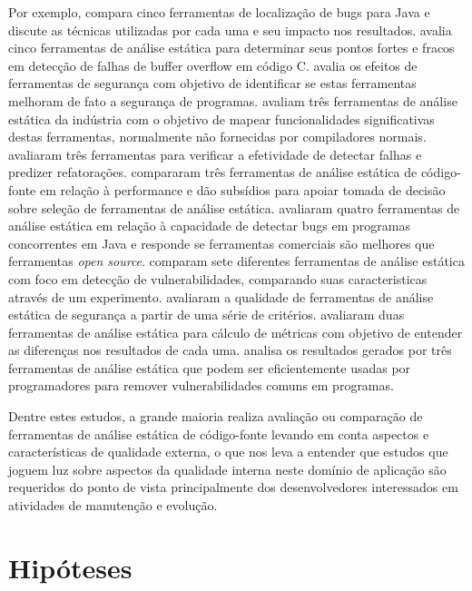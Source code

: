 Por exemplo,  compara cinco ferramentas de localização
de bugs para Java e discute as técnicas utilizadas por cada uma e seu impacto
nos resultados.  avalia cinco ferramentas de
análise estática para determinar seus pontos fortes e fracos em detecção de
falhas de buffer overflow em código C.  avalia os efeitos
de ferramentas de segurança com objetivo de identificar se estas ferramentas
melhoram de fato a segurança de programas. 
avaliam três ferramentas de análise estática da indústria com o objetivo de
mapear funcionalidades significativas destas ferramentas, normalmente não
fornecidas por compiladores normais.  avaliaram três
ferramentas para verificar a efetividade de detectar falhas e predizer
refatorações.  compararam três ferramentas de análise
estática de código-fonte em relação à performance e dão subsídios para apoiar
tomada de decisão sobre seleção de ferramentas de análise estática.
 avaliaram quatro ferramentas de análise estática em
relação à capacidade de detectar bugs em programas concorrentes em Java e
responde se ferramentas comerciais são melhores que ferramentas {\it open
source}.  comparam sete diferentes ferramentas de análise
estática com foco em detecção de vulnerabilidades, comparando suas
caracteristicas através de um experimento.  avaliaram a
qualidade de ferramentas de análise estática de segurança a partir de uma
série de critérios.  avaliaram duas ferramentas de
análise estática para cálculo de métricas com objetivo de entender as
diferenças nos resultados de cada uma.  analisa os
resultados gerados por três ferramentas de análise estática que podem ser
eficientemente usadas por programadores para remover vulnerabilidades comuns
em programas.

Dentre estes estudos, a grande maioria realiza avaliação ou comparação de
ferramentas de análise estática de código-fonte levando em conta aspectos e
características de qualidade externa, o que nos leva a entender que estudos
que joguem luz sobre aspectos da qualidade interna neste domínio de aplicação
são requeridos do ponto de vista principalmente dos desenvolvedores
interessados em atividades de manutenção e evolução.

\section{Hipóteses} \label{hipoteses}

